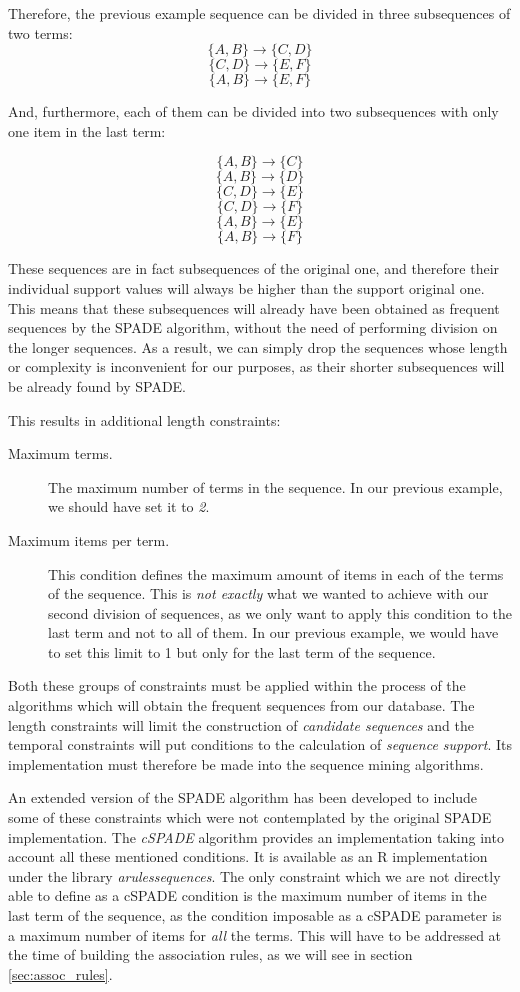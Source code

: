 \documentclass[a4paper,12pt]{article}
\begin{document}
Therefore, the previous example sequence can be divided in three subsequences of two terms:
$$\{A, B\} \longrightarrow \{C, D\}$$
$$\{C, D\} \longrightarrow \{E, F\}$$
$$\{A, B\} \longrightarrow \{E, F\}$$

And, furthermore, each of them can be divided into two subsequences with only one item in the last term:

$$\{A, B\} \longrightarrow \{C\}$$
$$\{A, B\} \longrightarrow \{D\}$$
$$\{C, D\} \longrightarrow \{E\}$$
$$\{C, D\} \longrightarrow \{F\}$$
$$\{A, B\} \longrightarrow \{E\}$$
$$\{A, B\} \longrightarrow \{F\}$$

These sequences are in fact subsequences of the original one, and therefore their individual support values will always be higher than the support original one. This means that these subsequences will already have been obtained as frequent sequences by the SPADE algorithm, without the need of performing division on the longer sequences. As a result, we can simply drop the sequences whose length or complexity is inconvenient for our purposes, as their shorter subsequences will be already found by SPADE.

This results in additional length constraints:
\begin{description}
\item[Maximum terms.] The maximum number of terms in the sequence. In our previous example, we should have set it to \emph{2}.
\item[Maximum items per term.] This condition defines the maximum amount of items in each of the terms of the sequence. This is \emph{not exactly} what we wanted to achieve with our second division of sequences, as we only want to apply this condition to the last term and not to all of them. In our previous example, we would have to set this limit to 1 but only for the last term of the sequence.
\end{description}

Both these groups of constraints must be applied within the process of the algorithms which will obtain the frequent sequences from our database. The length constraints will limit the construction of \emph{candidate sequences} and the temporal constraints will put conditions to the calculation of \emph{sequence support}. Its implementation must therefore be made into the sequence mining algorithms.

An extended version of the SPADE algorithm has been developed to include some of these constraints which were not contemplated by the original SPADE implementation. The \emph{cSPADE} algorithm\cite{zaki2000cspade,wu2010sequential} provides an implementation taking into account all these mentioned conditions. It is available as an R implementation under the library \emph{arulessequences}\cite{hahsler2011arules}. The only constraint which we are not directly able to define as a cSPADE condition is the maximum number of items in the last term of the sequence, as the condition imposable as a cSPADE parameter is a maximum number of items for \emph{all} the terms. This will have to be addressed at the time of building the association rules, as we will see in section \ref{sec:assoc_rules}.
\end{document}
